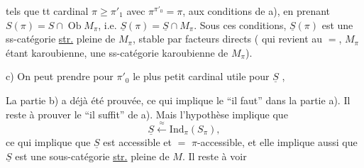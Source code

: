  tels que  tt cardinal $\pi\geq\pi'_1$ avec
$\pi^{\pi'_0}=\pi$,   aux conditions
de a), en prenant $S(\pi)=S\cap\operatorname{Ob}M_\pi$,
i.e. $\underline S(\pi)=\underline S\cap M_\pi$.  Sous ces conditions, 
$\underline S(\pi)$ est une ss-catégorie \uline{str.} pleine de $M_\pi$,
stable  par facteurs directs (
qui revient au $=$, $M_\pi$ étant karoubienne,
une ss-catégorie karoubienne de $M_\pi$).

c) On peut prendre  pour $\pi'_0$ le plus petit cardinal 
 utile pour $\underline S$ ,

La partie b)  a déjà été prouvée, ce
qui implique le ``il faut'' dans la partie
a). Il reste à prouver le ``il
suffit'' de a). Mais l'hypothèse
implique que
\[
 \underline S\xleftarrow{\approx}\mathrm{Ind}_\pi(S_\pi),
\]
ce qui implique que $\underline S$ est accessible
et $=$ $\pi$-accessible, et elle implique
aussi que $\underline S$ est une sous-catégorie
\uline{str.} pleine de $M$. Il reste à voir
